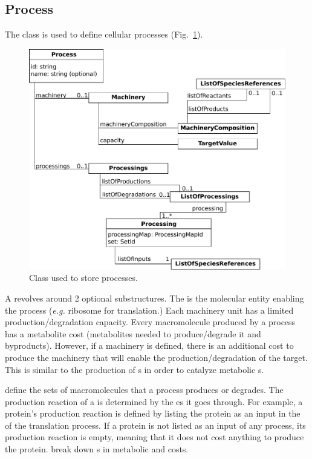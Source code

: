 \subsection{Process}
\label{sec:process}

The \process{} class is used to define cellular processes
(Fig.~\ref{fig:processes_process}).

\begin{figure}
  \centering
  \includegraphics[scale=0.8]{figures/processes_process}
  \caption{Class used to store processes.}
\label{fig:processes_process}
\end{figure}

A \process{} revolves around 2 optional substructures.
The \machinery{} is the molecular entity enabling the process
(\textit{e.g.} ribosome for translation.)
Each machinery unit has a limited production/degradation capacity.
Every macromolecule produced by a process has a metabolite cost
(metabolites needed to produce/degrade it and byproducts).
However, if a machinery is defined, there is an additional cost
to produce the machinery that will enable the production/degradation of the
target.
This is similar to the production of \enzyme{}s in order to catalyze
metabolic \reaction{}s.

\processings{} define the sets of macromolecules that a process
produces or degrades.
The production reaction of a \macromolecule{} is determined by the \process{}es
it goes through.
For example, a protein's production reaction is defined by listing
the protein as an input in the \processings{} of the translation process.
If a protein is not listed as an input of any process, its production reaction
is empty, meaning that it does not cost anything to produce the protein.
\processings{} break down \macromolecule{}s in metabolic \species{}
and \machinery{} costs.

